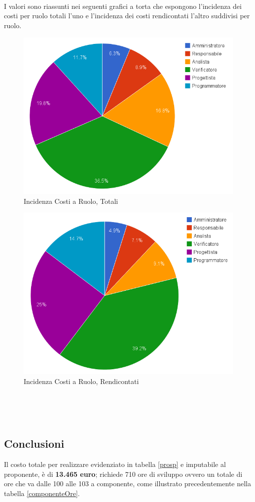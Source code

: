 \\	
\\
\\
I valori sono riassunti nei seguenti grafici a torta che espongono l'incidenza dei costi per ruolo totali l'uno e l'incidenza dei costi rendicontati l'altro suddivisi per ruolo.
\begin{figure}[!h]
	\centering
	\includegraphics[width=0.9\linewidth]{./content/Immagini/prospetti/totruoloinvestim.png}
	\caption{Incidenza Costi a Ruolo, Totali}
\end{figure}
\pagebreak
\begin{figure}[!h]
	\centering
	\includegraphics[width=0.9\linewidth]{./content/Immagini/prospetti/totaruoloremunerabili.png}
	\caption{Incidenza Costi a Ruolo, Rendicontati}
\end{figure}
\\
\\
\\
\subsection{Conclusioni}
\label{costiConclusioni}
Il costo totale per realizzare \project{} evidenziato in tabella \ref{prosp} e imputabile al proponente, è di \textbf{13.465 euro}; richiede 710 ore di sviluppo ovvero un totale di ore che va dalle 100 alle 103 a componente, come illustrato precedentemente nella tabella \ref{componenteOre}.

